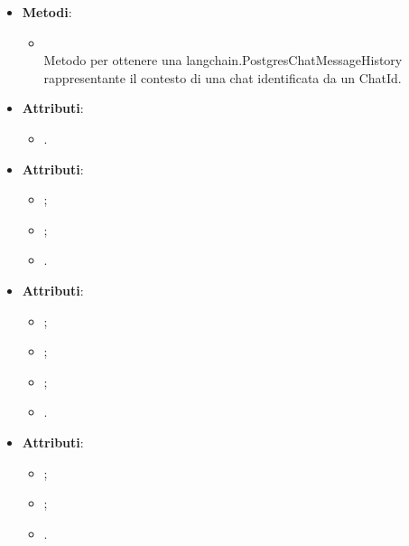 \documentclass[10pt, a4paper]{article}
\begin{document}
\label{ChatHistoryManagerDettaglio}
\begin{itemize}
    \item \textbf{Metodi}:
    \begin{itemize}
        \item {}\\
        Metodo per ottenere una langchain.PostgresChatMessageHistory rappresentante il contesto di una chat identificata da un ChatId.
    \end{itemize}
\end{itemize}


\label{ChatIdDettaglio}
\begin{itemize}
    \item \textbf{Attributi}:
    \begin{itemize}
        \item {}.
    \end{itemize}
\end{itemize}


\label{ChatOperationResponseDettaglio}
\begin{itemize}
    \item \textbf{Attributi}:
    \begin{itemize}
        \item {};
        \item {};
        \item {}.
    \end{itemize}
\end{itemize}

\label{MessageDettaglio}
\begin{itemize}
    \item \textbf{Attributi}:
    \begin{itemize}
        \item {};
        \item {};
        \item {};
        \item {}.
    \end{itemize}
\end{itemize}

\label{MessageResponseDettaglio}
\begin{itemize}
    \item \textbf{Attributi}:
    \begin{itemize}  
        \item {};
        \item {};
        \item {}.
    \end{itemize}
\end{itemize}
\end{document}
